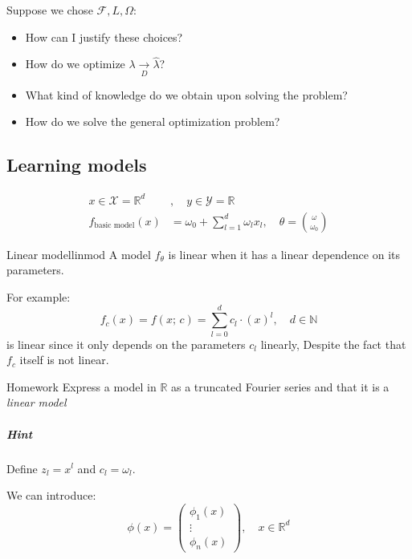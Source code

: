 \begin{question}{Suppose we chose $\mathcal{F}, L, \Omega$:}{}
\begin{itemize}
	\item How can I justify these choices?
	\item How do we optimize $\lambda \xrightarrow[D]{} \hat\lambda$?
	\item What kind of knowledge do we obtain upon solving the problem?
	\item How do we solve the general optimization problem?
\end{itemize}
\end{question}

\subsection{Learning models} %

\begin{align*}
	x \in \mathcal{X} = \mathds{R}^d & , \quad y \in \mathcal{Y} = \mathds{R}                                            \\
	f_{\text{basic model}}(x)        & = \omega_0 + \sum_{l = 1}^d \omega_l x_l, \quad \theta = \binom{\omega}{\omega_0}
\end{align*}

\begin{definition}{Linear model}{linmod}
A model $f_\theta$ is linear when it has a linear dependence on its parameters.

\tcblower
For example:
\begin{equation*}
	f_c(x) = f(x;\,c)
	       = \sum_{l=0}^d c_l \cdot (x)^l, \quad d \in \mathds{N}
\end{equation*}
is linear since it only depends on the parameters $c_l$ linearly,
Despite the fact that $f_c$ itself is not linear.
\end{definition}

\begin{exercise}{Homework}{}
Express a model in $\mathds{R}$ as a truncated Fourier series and
that it is a \emph{linear model}
\subparagraph{Hint} Define $z_l = x^l$ and $c_l = \omega_l$.
\end{exercise}

We can introduce:
\begin{equation*}
	\phi (x) = \left(\begin{array}{c}
			\phi_1(x) \\
			\vdots    \\
			\phi_n(x)
		\end{array}\right), \quad x \in \mathds{R}^d
\end{equation*}

